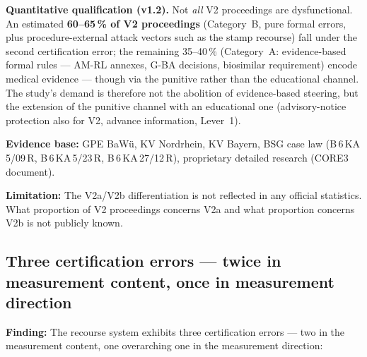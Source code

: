 \documentclass{umbruch-position}
\begin{document}
\textbf{Quantitative qualification (v1.2).} Not \emph{all} V2 proceedings are dysfunctional. An estimated \textbf{60--65\,\% of V2 proceedings} (Category~B, pure formal errors, plus procedure-external attack vectors such as the stamp recourse) fall under the second certification error; the remaining 35--40\,\% (Category~A: evidence-based formal rules --- AM-RL annexes, G-BA decisions, biosimilar requirement) encode medical evidence --- though via the punitive rather than the educational channel. The study's demand is therefore not the abolition of evidence-based steering, but the extension of the punitive channel with an educational one (advisory-notice protection also for V2, advance information, Lever~1).

\textbf{Evidence base:} GPE BaW\"u, KV Nordrhein, KV Bayern, BSG case law (B\,6\,KA\,5/09\,R, B\,6\,KA\,5/23\,R, B\,6\,KA\,27/12\,R), proprietary detailed research (CORE3 document).

\textbf{Limitation:} The V2a/V2b differentiation is not reflected in any official statistics. What proportion of V2 proceedings concerns V2a and what proportion concerns V2b is not publicly known.

\subsection{Three certification errors --- twice in measurement content, once in measurement direction}

\textbf{Finding:} The recourse system exhibits three certification errors --- two in the measurement content, one overarching one in the measurement direction:
\end{document}

